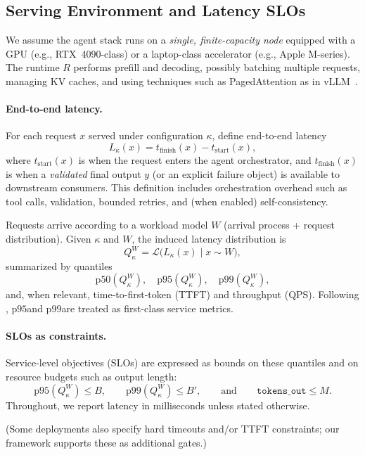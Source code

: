 \documentclass[11pt]{article}
\newcommand{\pninetyfive}{\ensuremath{\mathrm{p95}}}
\newcommand{\pninetynine}{\ensuremath{\mathrm{p99}}}
\newcommand{\slo}{\ensuremath{\mathrm{SLO}}}
\begin{document}
\subsection{Serving Environment and Latency SLOs}
\label{sec:problem-slo}

We assume the agent stack runs on a \emph{single, finite-capacity node} equipped with a GPU (e.g., RTX~4090-class) or a laptop-class accelerator (e.g., Apple M-series).
The runtime $R$ performs prefill and decoding, possibly batching multiple requests, managing KV caches, and using techniques such as PagedAttention as in vLLM~\citep{kwon2023vllm}.

\paragraph{End-to-end latency.}
For each request $x$ served under configuration $\kappa$, define end-to-end latency
\[
L_\kappa(x) = t_{\text{finish}}(x) - t_{\text{start}}(x),
\]
where $t_{\text{start}}(x)$ is when the request enters the agent orchestrator, and $t_{\text{finish}}(x)$ is when a \emph{validated} final output $y$ (or an explicit failure object) is available to downstream consumers.
This definition includes orchestration overhead such as tool calls, validation, bounded retries, and (when enabled) self-consistency.

Requests arrive according to a workload model $W$ (arrival process + request distribution).
Given $\kappa$ and $W$, the induced latency distribution is
\[
Q_\kappa^W = \mathcal{L}\bigl(L_\kappa(x)\mid x\sim W\bigr),
\]
summarized by quantiles
\[
\mathrm{p50}(Q_\kappa^W),\quad \mathrm{p95}(Q_\kappa^W),\quad \mathrm{p99}(Q_\kappa^W),
\]
and, when relevant, time-to-first-token (TTFT) and throughput (QPS).
Following \citet{dean2013tail}, \pninetyfive and \pninetynine are treated as first-class service metrics.

\paragraph{SLOs as constraints.}
Service-level objectives (\slo s) are expressed as bounds on these quantiles and on resource budgets such as output length:
\[
\mathrm{p95}(Q_\kappa^W)\le B,\qquad \mathrm{p99}(Q_\kappa^W)\le B',\qquad \text{and}\qquad \texttt{tokens\_out}\le M.
\]
Throughout, we report latency in milliseconds unless stated otherwise.

(Some deployments also specify hard timeouts and/or TTFT constraints; our framework supports these as additional gates.)
\end{document}
